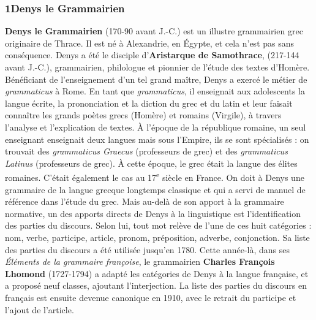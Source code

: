 \subsubsection*{1\quad Denys le Grammairien}
\textbf{Denys le Grammairien} (170-90 avant J.-C.) est un illustre grammairien grec originaire de Thrace. Il est né à Alexandrie, en Égypte, et cela n’est pas sans conséquence.
Denys a été le disciple d’\textbf{Aristarque de Samothrace}, (217-144 avant J.-C.), grammairien, philologue et pionnier de l’étude des textes d’Homère. Bénéficiant de l’enseignement d’un tel grand maître, Denys a exercé le métier de \textit{grammaticus} à Rome.
En tant que \textit{grammaticus}, il enseignait aux adolescents la langue écrite, la prononciation et la diction du grec et du latin et leur faisait connaître les grands poètes grecs (Homère) et romains (Virgile), à travers l’analyse et l’explication de textes. À l’époque de la république romaine, un seul enseignant enseignait deux langues mais sous l’Empire, ils se sont spécialisés : on trouvait des \textit{grammaticus Graecus} (professeurs de grec) et des \textit{grammaticus Latinus} (professeurs de grec). À cette époque, le grec était la langue des élites romaines. C’était également le cas au 17\textsuperscript{e} siècle en France.
On doit à Denys une grammaire de la langue grecque longtemps classique et qui a servi de manuel de référence dans l’étude du grec. Mais au-delà de son apport à la grammaire normative, un des apports directs de Denys à la linguistique est l’identification des parties du discours. Selon lui, tout mot relève de l’une de ces huit catégories : nom, verbe, participe, article, pronom, préposition, adverbe, conjonction. Sa liste des parties du discours a été utilisée jusqu’en 1780. Cette année-là, dans ses \textit{Éléments de la grammaire françoise}, le grammairien \textbf{Charles François Lhomond} (1727-1794) a adapté les catégories de Denys à la langue française, et a proposé neuf classes, ajoutant l’interjection. La liste des parties du discours en français est ensuite devenue canonique en 1910, avec le retrait du participe et l’ajout de l’article.
